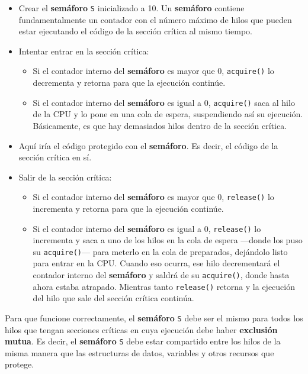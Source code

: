 \begin{itemize}
\item
  Crear el \textbf{semáforo} \texttt{S} inicializado a 10. Un
  \textbf{semáforo} contiene fundamentalmente un contador con el número
  máximo de hilos que pueden estar ejecutando el código de la sección
  crítica al mismo tiempo.
\item
  Intentar entrar en la sección crítica:

  \begin{itemize}
  \item
    Si el contador interno del \textbf{semáforo} es mayor que 0,
    \texttt{acquire()} lo decrementa y retorna para que la ejecución
    continúe.
  \item
    Si el contador interno del \textbf{semáforo} es igual a 0,
    \texttt{acquire()} saca al hilo de la CPU y lo pone en una cola de
    espera, suspendiendo así su ejecución. Básicamente, es que hay
    demasiados hilos dentro de la sección crítica.
  \end{itemize}
\item
  Aquí iría el código protegido con el \textbf{semáforo}. Es decir, el
  código de la sección crítica en sí.
\item
  Salir de la sección crítica:

  \begin{itemize}
  \item
    Si el contador interno del \textbf{semáforo} es mayor que 0,
    \texttt{release()} lo incrementa y retorna para que la ejecución
    continúe.
  \item
    Si el contador interno del \textbf{semáforo} es igual a 0,
    \texttt{release()} lo incrementa y saca a uno de los hilos en la
    cola de espera ---donde los puso su \texttt{acquire()}--- para
    meterlo en la cola de preparados, dejándolo listo para entrar en la
    CPU. Cuando eso ocurra, ese hilo decrementará el contador interno
    del \textbf{semáforo} y saldrá de su \texttt{acquire()}, donde hasta
    ahora estaba atrapado. Mientras tanto \texttt{release()} retorna y
    la ejecución del hilo que sale del sección crítica continúa.
  \end{itemize}
\end{itemize}

Para que funcione correctamente, el \textbf{semáforo} \texttt{S} debe
ser el mismo para todos los hilos que tengan secciones críticas en cuya
ejecución debe haber \textbf{exclusión mutua}. Es decir, el
\textbf{semáforo} \texttt{S} debe estar compartido entre los hilos de la
misma manera que las estructuras de datos, variables y otros recursos
que protege.

